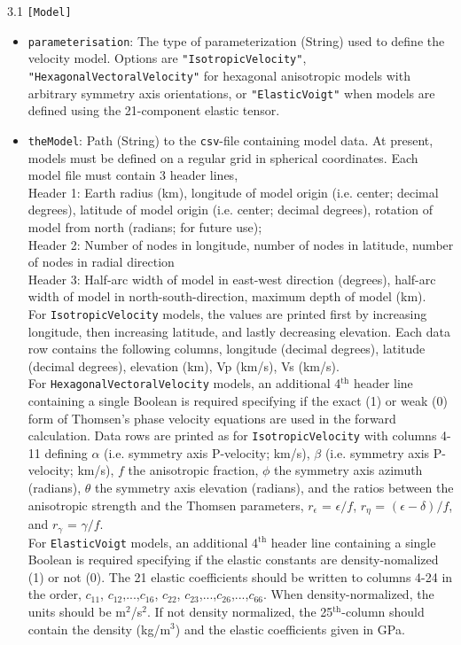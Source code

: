 3.1 \texttt{[Model]}
\begin{itemize}
\item \texttt{parameterisation}: The type of parameterization (String) used to define the velocity model. Options are \texttt{"IsotropicVelocity"},\\ \texttt{"HexagonalVectoralVelocity"} for hexagonal anisotropic models with arbitrary symmetry axis orientations, or \texttt{"ElasticVoigt"} when models are defined using the 21-component elastic tensor.
\item \texttt{theModel}: Path (String) to the \texttt{csv}-file containing model data. At present, models must be defined on a regular grid in spherical coordinates. Each model file must contain 3 header lines,\\
Header 1: Earth radius (km), longitude of model origin (i.e. center; decimal degrees), latitude of model origin (i.e. center; decimal degrees), rotation of model from north (radians; for future use);\\
Header 2: Number of nodes in longitude, number of nodes in latitude, number of nodes in radial direction\\
Header 3: Half-arc width of model in east-west direction (degrees), half-arc width of model in north-south-direction, maximum depth of model (km).\\
For \texttt{IsotropicVelocity} models, the values are printed first by increasing longitude, then increasing latitude, and lastly decreasing elevation. Each data row contains the following columns, longitude (decimal degrees), latitude (decimal degrees), elevation (km), Vp (km/s), Vs (km/s).\\
For \texttt{HexagonalVectoralVelocity} models, an additional 4$^{\text{th}}$ header line containing a single Boolean is required specifying if the exact (1) or weak (0) form of Thomsen's phase velocity equations are used in the forward calculation. Data rows are printed as for \texttt{IsotropicVelocity} with columns 4-11 defining $\alpha$ (i.e. symmetry axis P-velocity; km/s), $\beta$ (i.e. symmetry axis P-velocity; km/s), $f$ the anisotropic fraction, $\phi$ the symmetry axis azimuth (radians), $\theta$ the symmetry axis elevation (radians), and the ratios between the anisotropic strength and the Thomsen parameters, $r_{\epsilon}$ = $\epsilon/f$, $r_{\eta}$ = $(\epsilon - \delta)/f$, and $r_{\gamma}$ = $\gamma/f$.\\
For \texttt{ElasticVoigt} models, an additional 4$^{\text{th}}$ header line containing a single Boolean is required specifying if the elastic constants are density-nomalized (1) or not (0). The 21 elastic coefficients should be written to columns 4-24 in the order, $c_{11}$, $c_{12}$,...,$c_{16}$, $c_{22}$, $c_{23}$,...,$c_{26}$,...,$c_{66}$. When density-normalized, the units should be m$^2$/s$^2$. If not density normalized, the 25$^{\text{th}}$-column should contain the density (kg/m$^3$) and the elastic coefficients given in GPa.
\end{itemize}

